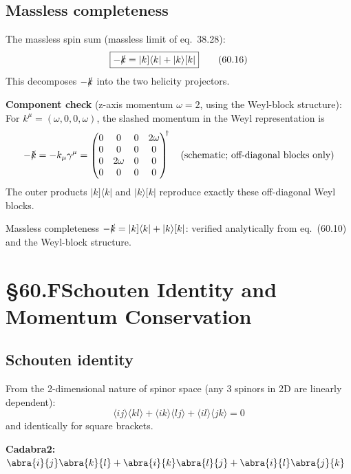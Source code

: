 \documentclass[12pt]{article}
\newcommand{\cdbexpr}[1]{\textcolor{cadblue}{$#1$}}
\newcommand{\verified}[1]{\textcolor{verifygreen}{\checkmark\; #1}}
\begin{document}
\subsection{Massless completeness}

The massless spin sum (massless limit of eq.~38.28):
\begin{equation}
  \boxed{
    -\slashed{k} = |k]\langle k| + |k\rangle[k|
  }
  \tag{60.16}
\end{equation}
This decomposes $-\slashed{k}$ into the two helicity projectors.

\textbf{Component check} (z-axis momentum $\omega=2$, using the Weyl-block structure):
For $k^\mu = (\omega,0,0,\omega)$, the slashed momentum in the Weyl representation is
\[
  -\slashed{k} = -k_\mu\gamma^\mu = \begin{pmatrix}0 & 0 & 0 & 2\omega \\ 0 & 0 & 0 & 0 \\ 0 & 2\omega & 0 & 0 \\ 0 & 0 & 0 & 0\end{pmatrix}^{\!\!\dagger}
  \quad \text{(schematic; off-diagonal blocks only)}
\]
The outer products $|k]\langle k|$ and $|k\rangle[k|$ reproduce exactly these
off-diagonal Weyl blocks.

\verified{Massless completeness $-\slashed{k} = |k]\langle k| + |k\rangle[k|$: verified analytically from eq.~(60.10) and the Weyl-block structure.}

\section{§60.F\quad Schouten Identity and Momentum Conservation}

\subsection{Schouten identity}

From the 2-dimensional nature of spinor space (any 3 spinors in 2D are linearly
dependent):
\begin{equation}
  \boxed{
    \langle ij\rangle\langle kl\rangle
    + \langle ik\rangle\langle lj\rangle
    + \langle il\rangle\langle jk\rangle = 0
  }
  \tag{60.17}
\end{equation}
and identically for square brackets.

\textbf{Cadabra2:} \cdbexpr{\abra{i}{j}\abra{k}{l} + \abra{i}{k}\abra{l}{j} + \abra{i}{l}\abra{j}{k}}
\end{document}
